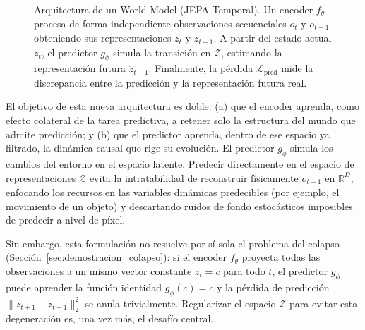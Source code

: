 \begin{figure}[H]
{
}
\caption{Arquitectura de un World Model (JEPA Temporal). Un encoder $f_\theta$ procesa de forma independiente observaciones secuenciales $o_t$ y $o_{t+1}$ obteniendo sus representaciones $z_t$ y $z_{t+1}$. A partir del estado actual $z_t$, el predictor $g_\phi$ simula la transici\'{o}n en $\mathcal{Z}$, estimando la representaci\'{o}n futura $\hat{z}_{t+1}$. Finalmente, la p\'{e}rdida $\mathcal{L}_{\text{pred}}$ mide la discrepancia entre la predicci\'{o}n y la representación futura real.}
\label{fig:simetria_vs_asimetria}
\end{figure}

El objetivo de esta nueva arquitectura es doble: (a) que el encoder aprenda, como efecto colateral de la tarea predictiva, a retener solo la estructura del mundo que admite predicción; y (b) que el predictor aprenda, dentro de ese espacio ya filtrado, la dinámica causal que rige su evolución. El predictor $g_{\phi}$ simula los cambios del entorno en el espacio latente. Predecir directamente en el espacio de representaciones $\mathcal{Z}$ evita la intratabilidad de reconstruir físicamente $o_{t+1}$ en $\mathbb{R}^D$, enfocando los recursos en las variables dinámicas predecibles (por ejemplo, el movimiento de un objeto) y descartando ruidos de fondo estocásticos imposibles de predecir a nivel de píxel.

Sin embargo, esta formulación no resuelve por sí sola el problema del colapso (Sección~\ref{sec:demostracion_colapso}): si el encoder $f_\theta$ proyecta todas las observaciones a un mismo vector constante $z_t = c$ para todo $t$, el predictor $g_\phi$ puede aprender la función identidad $g_\phi(c) = c$ y la pérdida de predicción $\|\hat{z}_{t+1} - z_{t+1}\|_2^2$ se anula trivialmente. Regularizar el espacio $\mathcal{Z}$ para evitar esta degeneración es, una vez más, el desafío central.

